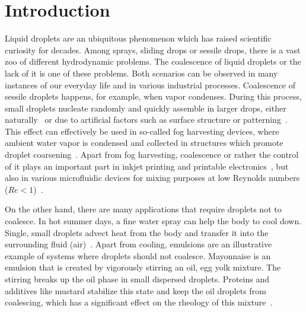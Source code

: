 \documentclass[twocolumn,amsmath,amssymb,showpacs,nofootinbib,prfluids,superscriptaddress]{revtex4-2} %
\begin{document}
\maketitle
 
\newcommand{\ts}{\textsuperscript}

\section{Introduction}\label{sec:intro}
Liquid droplets are an ubiquitous phenomenon which has raised scientific curiosity for decades.
Among sprays, sliding drops or sessile drops, there is a vast zoo of different hydrodynamic problems.
The coalescence of liquid droplets or the lack of it is one of these problems. 
Both scenarios can be observed in many instances of our everyday life and in various industrial processes.
Coalescence of sessile droplets happens, for example, when vapor condenses.
During this process, small droplets nucleate randomly and quickly assemble in larger drops, either naturally~\cite{PhysRevA.43.1906} or due to artificial factors such as surface structure or patterning~\cite{C1SM06219K}. 
This effect can effectively be used in so-called fog harvesting devices, where ambient water vapor is condensed and collected in structures which promote droplet coarsening~\cite{zhang2015inkjet, shi2018fog}.
Apart from fog harvesting, coalescence or rather the control of it plays an important part in inkjet printing and printable electronics~\cite{jo2009evaluation, singh2010inkjet, Kim_2005, Luechinger_2008}, but also in various microfluidic devices for mixing purposes at low Reynolds numbers ($Re < 1$)~\cite{https://doi.org/10.1002/pen.760352206, doi:10.1063/1.858199}. 

On the other hand, there are many applications that require droplets not to coalesce.
In hot summer days, a fine water spray can help the body to cool down.
Single, small droplets advect heat from the body and transfer it into the surrounding fluid (air)~\cite{kim2007spray}.
Apart from cooling, emulsions are an illustrative example of systems where droplets should not coalesce.
Mayonnaise is an emulsion that is created by vigorously stirring an oil, egg yolk mixture. 
The stirring breaks up the oil phase in small dispersed droplets.
Proteins and additives like mustard stabilize this state and keep the oil droplets from coalescing, which has a significant effect on the rheology of this mixture~\cite{harrison1985factors, DEPREE2001157}.
\end{document}
